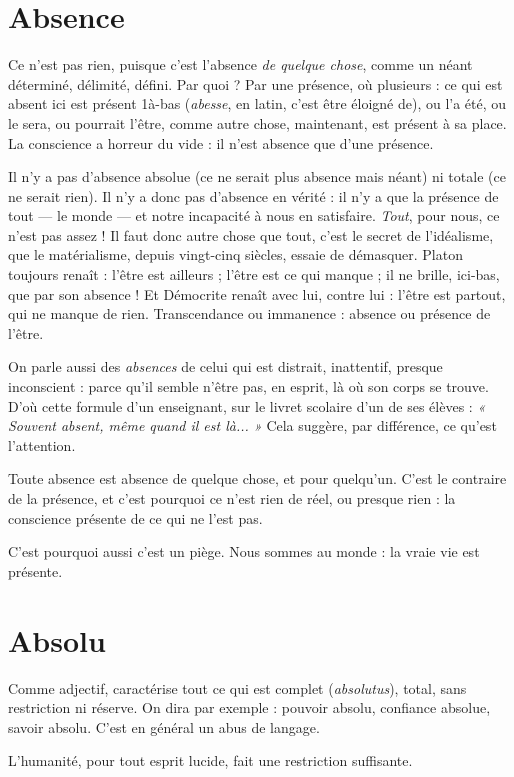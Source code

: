 \section{Absence}
Ce n’est pas rien, puisque c’est l'absence {\it de quelque chose}, comme
un néant déterminé, délimité, défini. Par quoi ? Par une présence,
où plusieurs : ce qui est absent ici est présent 1à-bas ({\it abesse}, en latin, c'est
être éloigné de), ou l’a été, ou le sera, ou pourrait l’être, comme autre chose,
maintenant, est présent à sa place. La conscience a horreur du vide : il n’est
absence que d’une présence.

Il n’y a pas d’absence absolue (ce ne serait plus absence mais néant) ni totale
(ce ne serait rien). Il n’y a donc pas d’absence en vérité : il n’y a que la présence
de tout — le monde — et notre incapacité à nous en satisfaire. {\it Tout}, pour nous, ce
n'est pas assez ! Il faut donc autre chose que tout, c’est le secret de l’idéalisme, que
le matérialisme, depuis vingt-cinq siècles, essaie de démasquer. Platon toujours
renaît : l'être est ailleurs ; l'être est ce qui manque ; il ne brille, ici-bas, que par son
absence ! Et Démocrite renaît avec lui, contre lui : l’être est partout, qui ne
manque de rien. Transcendance ou immanence : absence ou présence de l'être.

On parle aussi des {\it absences} de celui qui est distrait, inattentif, presque
inconscient : parce qu’il semble n’être pas, en esprit, là où son corps se trouve.
D'où cette formule d’un enseignant, sur le livret scolaire d’un de ses élèves :
{\it « Souvent absent, même quand il est là... »} Cela suggère, par différence, ce qu’est
l'attention.

Toute absence est absence de quelque chose, et pour quelqu’un. C’est le
contraire de la présence, et c’est pourquoi ce n’est rien de réel, ou presque rien :
la conscience présente de ce qui ne l’est pas.

C’est pourquoi aussi c’est un piège. Nous sommes au monde : la vraie vie
est présente.

\section{Absolu}
Comme adjectif, caractérise tout ce qui est complet ({\it absolutus}),
total, sans restriction ni réserve. On dira par exemple : pouvoir
absolu, confiance absolue, savoir absolu. C’est en général un abus de langage.

L'humanité, pour tout esprit lucide, fait une restriction suffisante.

